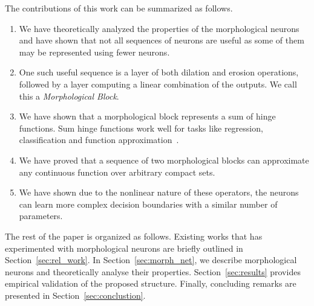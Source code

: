 \documentclass{bmvc2k}
\begin{document}
The contributions of this work can be summarized as follows.
\begin{enumerate}
\item We have theoretically analyzed the properties of the morphological neurons and have shown that not all sequences of neurons are useful as some of them may be represented using fewer neurons.
\item One such useful sequence is a layer of both dilation and erosion operations, followed by a layer computing a linear combination of the outputs. We call this a \emph{Morphological Block}.
\item We have shown that a morphological block represents a sum of hinge functions. Sum hinge functions work well for tasks like regression, classification and function approximation~\cite{breiman1993hinging}.
\item We have proved that a sequence of two morphological blocks can approximate any continuous function over arbitrary compact sets.
\item We have shown due to the nonlinear nature of these operators, the neurons can learn more  complex decision boundaries with a similar number of parameters. 
\end{enumerate}

The rest of the paper is organized as follows. Existing works that has experimented with morphological neurons are briefly outlined in Section~\ref{sec:rel_work}. In Section~\ref{sec:morph_net}, we describe morphological neurons and theoretically analyse their properties. Section~\ref{sec:results} provides empirical validation of the proposed structure. Finally, concluding remarks are presented in Section~\ref{sec:conclustion}. 
\end{document}
